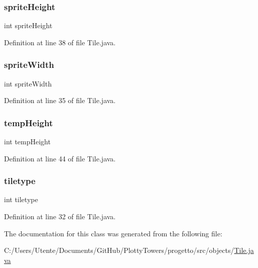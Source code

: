 \subsubsection{\texorpdfstring{sprite\+Height}{spriteHeight}}
{\footnotesize\ttfamily int sprite\+Height\hspace{0.3cm}{\ttfamily [static]}}



Definition at line 38 of file Tile.\+java.

\mbox{\label{classobjects_1_1_tile_afbef0b8f1824dfedcb984b1547cc0dde}} 
\subsubsection{\texorpdfstring{sprite\+Width}{spriteWidth}}
{\footnotesize\ttfamily int sprite\+Width\hspace{0.3cm}{\ttfamily [static]}}



Definition at line 35 of file Tile.\+java.

\mbox{\label{classobjects_1_1_tile_a6cb3d99320ebf80da884900b159d240e}} 
\subsubsection{\texorpdfstring{temp\+Height}{tempHeight}}
{\footnotesize\ttfamily int temp\+Height\hspace{0.3cm}{\ttfamily [private]}}



Definition at line 44 of file Tile.\+java.

\mbox{\label{classobjects_1_1_tile_aa7bcd46686997f7cbef377c22eed1c8d}} 
\subsubsection{\texorpdfstring{tiletype}{tiletype}}
{\footnotesize\ttfamily int tiletype\hspace{0.3cm}{\ttfamily [private]}}



Definition at line 32 of file Tile.\+java.



The documentation for this class was generated from the following file\+:\begin{DoxyCompactItemize}
\item 
C\+:/\+Users/\+Utente/\+Documents/\+Git\+Hub/\+Plotty\+Towers/progetto/src/objects/\hyperlink{_tile_8java}{Tile.\+java}\end{DoxyCompactItemize}

